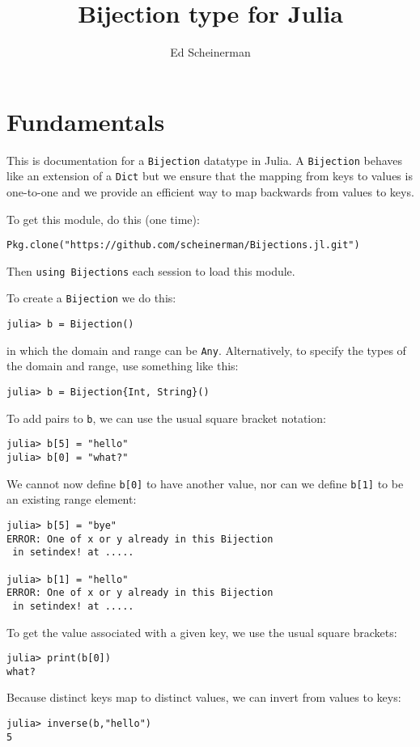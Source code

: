 \documentclass[12pt,oneside]{amsart}
\title{Bijection type for Julia}
\author{Ed Scheinerman}
\begin{document}
\maketitle

\section*{Fundamentals}

This is documentation for a \verb|Bijection| datatype in Julia.  A
\verb|Bijection| behaves like an extension of a \verb|Dict| but we
ensure that the mapping from keys to values is one-to-one and we
provide an efficient way to map backwards from values to keys.

To get this module, do this (one time):
\begin{verbatim}
Pkg.clone("https://github.com/scheinerman/Bijections.jl.git")
\end{verbatim}
Then \verb|using Bijections| each session to load this module. 

To create a \verb|Bijection| we do
this:
\begin{verbatim}
julia> b = Bijection()
\end{verbatim}
in which the domain and range can be \verb|Any|. Alternatively, to
specify the types of the domain and range, use something like this:
\begin{verbatim}
julia> b = Bijection{Int, String}()
\end{verbatim}

To add pairs to \verb|b|, we can use the usual square bracket
notation:
\begin{verbatim}
julia> b[5] = "hello"
julia> b[0] = "what?"
\end{verbatim}
We cannot now define \verb|b[0]| to have another value,
nor can we define \verb|b[1]| to be an existing range element:
\begin{verbatim}
julia> b[5] = "bye"
ERROR: One of x or y already in this Bijection
 in setindex! at .....

julia> b[1] = "hello"
ERROR: One of x or y already in this Bijection
 in setindex! at .....
\end{verbatim}

To get the value associated with a given key, we use the usual square
brackets:
\begin{verbatim}
julia> print(b[0])
what?
\end{verbatim}

Because distinct keys map to distinct values, we can invert from
values to keys:
\begin{verbatim}
julia> inverse(b,"hello")
5
\end{verbatim}
\end{document}
